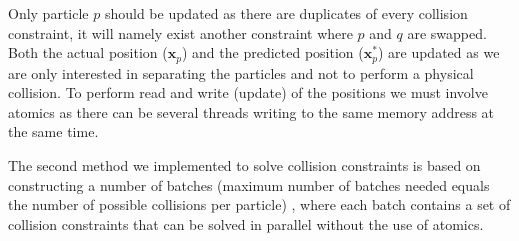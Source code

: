 Only particle $p$ should be updated as there are duplicates of every collision
constraint, it will namely exist another constraint where $p$ and $q$ are
swapped. Both the actual position ($\mathbf{x}_{p}$) and the predicted position
($\mathbf{x}_{p}^{*}$) are updated as we are only interested in separating the
particles and not to perform a physical collision. To perform read and write
(update) of the positions we must involve atomics as there can be several
threads writing to the same memory address at the same time.

The second method we implemented to solve collision constraints is based on
constructing a number of batches (maximum number of batches needed equals the
number of possible collisions per particle) \cite{bullet}, where each batch
contains a set of collision constraints that can be solved in parallel without
the use of atomics.
